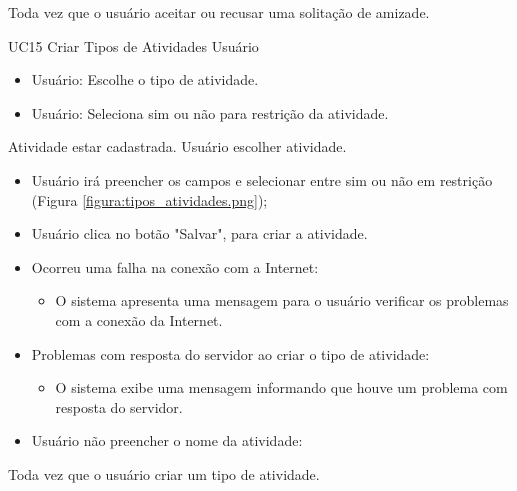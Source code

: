 {Toda vez que o usuário aceitar ou recusar uma solitação de amizade.}
{
 
}

\casoDeUso
{UC15}
{Criar Tipos de Atividades}
{Usuário}
{
\begin{itemize}
	\item Usuário: Escolhe o tipo de atividade.
	\item Usuário: Seleciona sim ou não para restrição da atividade.
\end{itemize}

}
{Atividade estar cadastrada.}
{Usuário escolher atividade.}
{
\begin{itemize}
		\item Usuário irá preencher os campos e selecionar entre sim ou não em restrição (Figura \ref{figura:tipos_atividades.png});
		\item Usuário clica no botão "Salvar", para criar a atividade.
\end{itemize}
}
{
\begin{itemize}
	\item Ocorreu uma falha na conexão com a Internet:
	\begin{itemize}
		\item O sistema apresenta uma mensagem para o usuário verificar os problemas com a conexão da Internet.
	\end{itemize}
	
	\item Problemas com resposta do servidor ao criar o tipo de atividade:
	\begin{itemize}
	\item O sistema exibe uma mensagem informando que houve um problema com resposta do servidor.
	\end{itemize}
	
	\item Usuário não preencher o nome da atividade:

\end{itemize}
}
{Toda vez que o usuário criar um tipo de atividade.}
{
 
}

